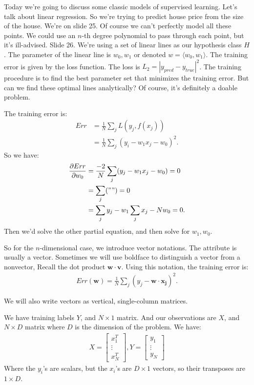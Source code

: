 \documentclass{amsbook}
\theoremstyle{plain}
\numberwithin{section}{chapter}
\numberwithin{equation}{chapter}
\theoremstyle{definition}
\theoremstyle{remark}
\newcommand{\bee}{\begin{equation}\begin{aligned}}
\newcommand{\eee}{\end{aligned}\end{equation}}
\newcommand{\fracc}{\frac}
\begin{document}
Today we're going to discuss some classic models of supervised learning. Let's talk about linear regression. So we're trying to predict house price from the size of the house. We're on slide 25. Of course we can't perfectly model all these points. We could use an $n$-th degree polynomial to pass through each point, but it's ill-advised. Slide 26. We're using a set of linear lines as our hypothesis class $H$. The parameter of the linear line is $w_0,w_1$ or denoted $w = \langle w_0,w_1\rangle$. The training error is given by the loss function. The loss is $L_2 = |y_{pred} - y_{true}|^2$. The training procedure is to find the best parameter set that minimizes the training error. But can we find these optimal lines analytically? Of course, it's definitely a doable problem. 

The training error is:
\bee
Err &= \fracc{1}{N}\sum_j L(y_j,f(x_j))\\
&= \fracc{1}{N}\sum_j(y_i - w_1x_j - w_0)^2.
\eee
So we have:
\bee
\fracc{\partial Err}{\partial w_0} &= \fracc{-2}{N}\sum_j (y_j - w_1x_j - w_0) = 0\\
&= \sum_j("") = 0\\
&= \sum_jy_j - w_1\sum_jx_j - Nw_0 = 0.
\eee
Then we'd solve the other partial equation, and then solve for $w_1,w_0$. 


So for the $n$-dimensional case, we introduce vector notations. The attribute is usually a vector. Sometimes we will use boldface to distinguish a vector from a nonvector, Recall the dot product $\mathbf{w}\cdot \mathbf{v}$. Using this notation, the training error is:
\bee
Err(\mathbf{w}) = \fracc{1}{N}\sum_j(y_j - \mathbf{w}\cdot \mathbf{x_j})^2.
\eee

We will also write vectors as vertical, single-column matrices. 

We have training labels $Y$, and $N \times 1$ matrix. And our observations are $X$, and $N \times D$ matrix where $D$ is the dimension of the problem. We have:
\bee
X = \left[\begin{matrix}
x_1^T\\
\vdots\\
x_N^T
\end{matrix} \right], Y = 
\left[\begin{matrix}
y_1\\
\vdots\\
y_N
\end{matrix} \right]
\eee
Where the $y_i$'s are scalars, but the $x_i$'s are $D \times 1$ vectors, so their transposes are $1 \times D$. 
\end{document}
